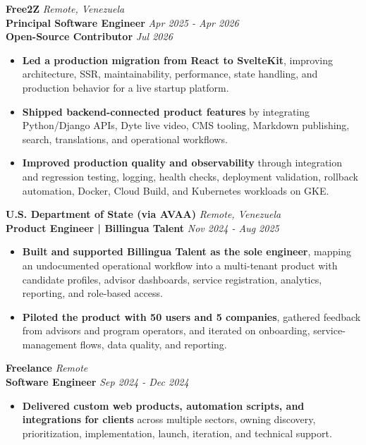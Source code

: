 \documentclass[10pt]{article}
\begin{document}
\vspace{1pt}
\textbf{Free2Z} \hfill \textit{Remote, Venezuela} \\
\textbf{Principal Software Engineer} \hfill \textit{Apr 2025 - Apr 2026} \\
\textbf{Open-Source Contributor} \hfill \textit{Jul 2026}
\begin{itemize}
    \item \textbf{Led a production migration from React to SvelteKit}, improving architecture, SSR, maintainability, performance, state handling, and production behavior for a live startup platform.
    \item \textbf{Shipped backend-connected product features} by integrating Python/Django APIs, Dyte live video, CMS tooling, Markdown publishing, search, translations, and operational workflows.
    \item \textbf{Improved production quality and observability} through integration and regression testing, logging, health checks, deployment validation, rollback automation, Docker, Cloud Build, and Kubernetes workloads on GKE.
\end{itemize}

\vspace{1pt}
\textbf{U.S. Department of State (via AVAA)} \hfill \textit{Remote, Venezuela} \\
\textbf{Product Engineer | Billingua Talent} \hfill \textit{Nov 2024 - Aug 2025}
\begin{itemize}
    \item \textbf{Built and supported Billingua Talent as the sole engineer}, mapping an undocumented operational workflow into a multi-tenant product with candidate profiles, advisor dashboards, service registration, analytics, reporting, and role-based access.
    \item \textbf{Piloted the product with 50 users and 5 companies}, gathered feedback from advisors and program operators, and iterated on onboarding, service-management flows, data quality, and reporting.
\end{itemize}

\vspace{1pt}
\textbf{Freelance} \hfill \textit{Remote} \\
\textbf{Software Engineer} \hfill \textit{Sep 2024 - Dec 2024}
\begin{itemize}
    \item \textbf{Delivered custom web products, automation scripts, and integrations for clients} across multiple sectors, owning discovery, prioritization, implementation, launch, iteration, and technical support.
\end{itemize}
\end{document}
